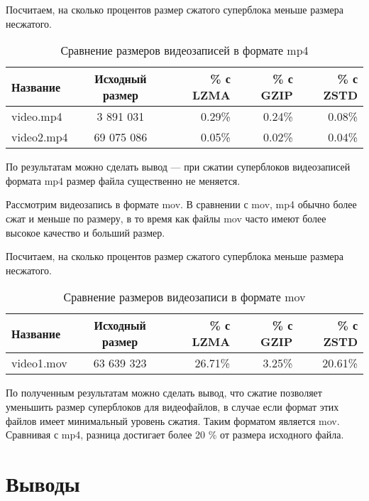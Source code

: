 

Посчитаем, на сколько процентов размер сжатого суперблока меньше размера несжатого.   

\begin{table}[h]
\centering
\caption{Сравнение размеров видеозаписей в формате mp4}
\begin{tabular}{|l|c|r|r|r|}
\hline
Название & Исходный размер & \% с LZMA & \% с GZIP & \% с ZSTD \\
\hline
video.mp4 & 3 891 031 & 0.29\% & 0.24\% &  0.08\% \\
\hline
video2.mp4 & 69 075 086 & 0.05\% &  0.02\% & 0.04\% \\
\hline
\end{tabular}
\end{table}

По результатам можно сделать вывод --- при сжатии суперблоков видеозаписей формата mp4 размер файла существенно не меняется.

Рассмотрим видеозапись в формате mov. В сравнении с mov, mp4 обычно более сжат и меньше по размеру, в то время как файлы mov часто имеют более высокое качество и больший размер.



Посчитаем, на сколько процентов размер сжатого суперблока меньше размера несжатого.   
\begin{table}[h]
\centering
\caption{Сравнение размеров видеозаписи в формате mov}
\begin{tabular}{|l|c|r|r|r|}
\hline
Название & Исходный размер & \% с LZMA & \% с GZIP & \% с ZSTD \\
\hline
video1.mov & 63 639 323 & 26.71\% & 3.25\% &  20.61\% \\
\hline
\end{tabular}
\end{table}

По полученным результатам можно сделать вывод, что сжатие позволяет уменьшить размер суперблоков для видеофайлов, в случае если формат этих файлов имеет минимальный уровень сжатия. Таким форматом является mov. Сравнивая с mp4, разница достигает более 20 \% от размера исходного файла.  

\newpage
\section{Выводы}

